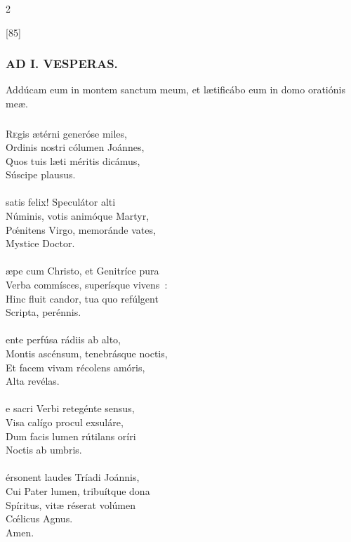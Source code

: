 \documentclass[9pt,twoside]{extarticle}
\begin{document}
\begin{multicols}{2}
\begin{tightlist}{}
\item {} [85] 
\end{tightlist}
\subsubsection*{\center \textsc{AD I. VESPERAS.}}
\begin{tightlist}{}
\item {}
\item {} Addúcam eum in montem sanctum meum, et lætificábo eum in domo oratiónis meæ. 
\end{tightlist}

\subsubsection*{\center{}}
\lettrine{R}egis ætérni generóse miles,\\ Ordinis nostri cólumen Joánnes,\\ Quos tuis læti méritis dicámus,\\ Súscipe plausus.\\
\\ 
 satis felix! Speculátor alti\\ Núminis, votis animóque Martyr,\\ Pœ́nitens Virgo, memoránde vates,\\ Mystice Doctor.\\
\\
æpe cum Christo, et Genitríce pura\\ Verba commísces, superísque vivens~:\\ Hinc fluit candor, tua quo refúlgent\\ Scripta, perénnis.\\
\\
ente perfúsa rádiis ab alto,\\ Montis ascénsum, tenebrásque noctis,\\ Et facem vivam récolens amóris,\\ Alta revélas.\\
\\
e sacri Verbi retegénte sensus,\\ Visa calígo procul exsuláre,\\ Dum facis lumen rútilans oríri\\ Noctis ab umbris.\\
\\
érsonent laudes Tríadi Joánnis,\\ Cui Pater lumen, tribuítque dona\\ Spíritus, vitæ réserat volúmen\\ Cœ́licus Agnus.\\
Amen.


\end{multicols}
\end{document}
